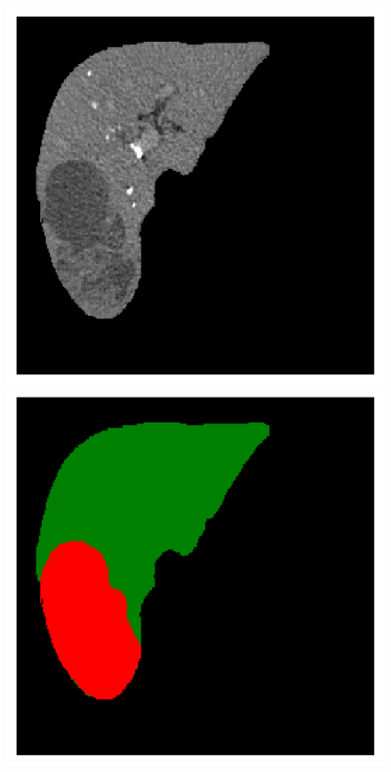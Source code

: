 {\begin{figure}[!ht]
\begin{mdframed}[backgroundcolor=blue!50,linecolor=blue!50]
\begin{minipage}{4cm}
	\end{minipage} \\
	\begin{minipage}{4cm}
		\includegraphics[width=\linewidth]{images/TumorMult_Raw_Pat0_4}
	\end{minipage} \hspace{-0.3cm}
	\begin{minipage}{4cm}
		\includegraphics[width=\linewidth]{images/TumorMult_GT_Pat0_4}

\end{minipage}
\end{mdframed}
\end{figure}}
